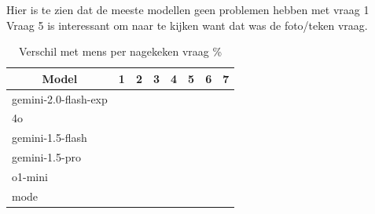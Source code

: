 \documentclass[12pt]{article}
\begin{document}
\noindent\begin{table}[H]
\caption{Verschil met mens per nagekeken vraag \%}
Hier is te zien dat de meeste modellen geen problemen hebben met vraag 1\\
Vraag 5 is interessant om naar te kijken want dat was de foto/teken vraag.
\begin{tabularx}{\textwidth}{X rrrrrrr}
    \toprule
    \multicolumn{1}{c}{\textbf{Model}} & \multicolumn{1}{c}{\textbf{1}} & \multicolumn{1}{c}{\textbf{2}} & \multicolumn{1}{c}{\textbf{3}} & \multicolumn{1}{c}{\textbf{4}} & \multicolumn{1}{c}{\textbf{5}} & \multicolumn{1}{c}{\textbf{6}} & \multicolumn{1}{c}{\textbf{7}} \\
    \midrule
    gemini-2.0-flash-exp & \cellcolor[rgb]{0.275,0.514,0.275}{0.00} & \cellcolor[rgb]{0.442,0.626,0.442}{4.44} & \cellcolor[rgb]{0.881,0.921,0.881}{16.09} & \cellcolor[rgb]{0.543,0.693,0.543}{7.11} & \cellcolor[rgb]{0.543,0.694,0.543}{7.12} & \cellcolor[rgb]{0.450,0.631,0.450}{4.65} & \cellcolor[rgb]{0.639,0.758,0.639}{9.67}  \\
    4o & \cellcolor[rgb]{0.439,0.624,0.439}{4.35} & \cellcolor[rgb]{0.360,0.571,0.360}{2.27} & \cellcolor[rgb]{0.510,0.671,0.510}{6.23} & \cellcolor[rgb]{0.683,0.787,0.683}{10.82} & \cellcolor[rgb]{0.458,0.637,0.458}{4.87} & \cellcolor[rgb]{0.608,0.737,0.608}{8.83} & \cellcolor[rgb]{0.717,0.810,0.717}{11.74} \\
    gemini-1.5-flash & \cellcolor[rgb]{0.439,0.624,0.439}{4.35} & \cellcolor[rgb]{0.275,0.514,0.275}{0.00} & \cellcolor[rgb]{0.772,0.847,0.772}{13.19} & \cellcolor[rgb]{0.880,0.920,0.880}{16.06} & \cellcolor[rgb]{0.623,0.747,0.623}{9.23} & \cellcolor[rgb]{0.450,0.631,0.450}{4.65} & \cellcolor[rgb]{0.975,0.983,0.975}{18.56}\\
    gemini-1.5-pro & \cellcolor[rgb]{0.439,0.624,0.439}{4.35} & \cellcolor[rgb]{0.360,0.571,0.360}{2.27} & \cellcolor[rgb]{0.931,0.953,0.931}{17.39} & \cellcolor[rgb]{0.767,0.844,0.767}{13.05} & \cellcolor[rgb]{0.623,0.747,0.623}{9.23} & \cellcolor[rgb]{0.608,0.737,0.608}{8.83} & \cellcolor[rgb]{0.918,0.945,0.918}{17.07}\\
    o1-mini & \cellcolor[rgb]{0.275,0.514,0.275}{0.00} & \cellcolor[rgb]{0.903,0.935,0.903}{16.65} & \cellcolor[rgb]{0.829,0.885,0.829}{14.69} & \cellcolor[rgb]{0.387,0.589,0.387}{2.98} & \cellcolor[rgb]{1.000,1.000,1.000}{19.23} & \cellcolor[rgb]{0.450,0.631,0.450}{4.65} & \cellcolor[rgb]{0.556,0.703,0.556}{7.47} \\
    mode & \cellcolor[rgb]{0.439,0.624,0.439}{4.35} & \cellcolor[rgb]{0.275,0.514,0.275}{0.00} & \cellcolor[rgb]{0.435,0.621,0.435}{4.25} & \cellcolor[rgb]{0.683,0.787,0.683}{10.82} & \cellcolor[rgb]{0.623,0.747,0.623}{9.23} & \cellcolor[rgb]{0.531,0.686,0.531}{6.79} & \cellcolor[rgb]{0.790,0.859,0.790}{13.66} \\
    \bottomrule
\end{tabularx}
\end{table}
\end{document}
